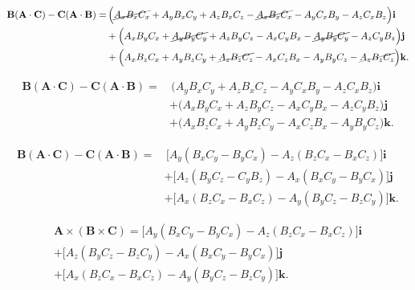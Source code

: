 \documentclass[a4paper,12pt]{article}
\newcommand{\printingbibliography}{%

    \pagestyle{myheadings}
    \markright{}
    \sloppy
    \printbibliography[heading=bibintoc, %
                   title=Refer\^encias %
                  ]
    \fussy%
}
\begin{document}
\begin{equation}
    \begin{aligned}
\mathbf{B} (\mathbf{A} \cdot \mathbf{C}) - \mathbf{C} (\mathbf{A} \cdot \mathbf{B}) = & \, \Big( \cancel{A_x B_x C_x} + A_y B_x C_y + A_z B_x C_z -  \cancel{A_x B_x C_x}  - A_y C_x B_y - A_z C_xB_z \Big) \mathbf{i} \\
& + \Big(  A_x B_y C_x + \cancel{A_y B_y C_y} + A_z B_y C_z  - A_x C_y B_x - \cancel{A_y B_y C_y} - A_z C_y B_z \Big) \mathbf{j} \\
& + \Big(  A_x B_z C_x + A_y B_z C_y + \cancel{A_z B_z C_z} - A_x C_z B_x - A_y B_y C_z - \cancel{A_z B_z C_z} \Big) \mathbf{k}.
    \end{aligned}
\end{equation}

\begin{equation}
    \begin{aligned}
\mathbf{B} (\mathbf{A} \cdot \mathbf{C}) - \mathbf{C} (\mathbf{A} \cdot \mathbf{B}) = & \, \Big(A_y B_x C_y + A_z B_x C_z - A_y C_x B_y - A_z C_xB_z \Big) \mathbf{i} \\
& + \Big(  A_x B_y C_x + A_z B_y C_z  - A_x C_y B_x - A_z C_y B_z \Big) \mathbf{j} \\
& + \Big(  A_x B_z C_x + A_y B_z C_y - A_x C_z B_x - A_y B_y C_z \Big) \mathbf{k}.
    \end{aligned}
\end{equation}

\begin{equation}
\boxed{
    \begin{aligned}
\mathbf{B} (\mathbf{A} \cdot \mathbf{C}) - \mathbf{C} (\mathbf{A} \cdot \mathbf{B}) = & \, \Big[A_y (B_x C_y -B_y C_x ) - A_z (B_z C_x - B_x C_z) \Big] \mathbf{i} \\
& + \Big[ A_z (B_y C_z - C_y B_z) - A_x (B_x C_y  - B_y C_x)     \Big] \mathbf{j} \\
& + \Big[  A_x(B_z C_x - B_x C_z)  - A_y (B_y C_z - B_z C_y)   \Big] \mathbf{k}.
    \end{aligned}
}
\end{equation}


\begin{equation}
    \boxed{
    \begin{aligned}
    \mathbf{A} \times (\mathbf{B} \times \mathbf{C}) = \Big[ A_y(B_xC_y - B_yC_x) - A_z(B_zC_x - B_xC_z) \Big] \mathbf{i} \\ +
    \Big[A_z(B_yC_z - B_zC_y) - A_x(B_xC_y - B_yC_x) \Big] \mathbf{j}\\ +
    \Big[ A_x(B_zC_x - B_xC_z) - A_y(B_yC_z - B_zC_y) \Big] \mathbf{k}.
\end{aligned}
    }
\end{equation}\\

\end{document}
